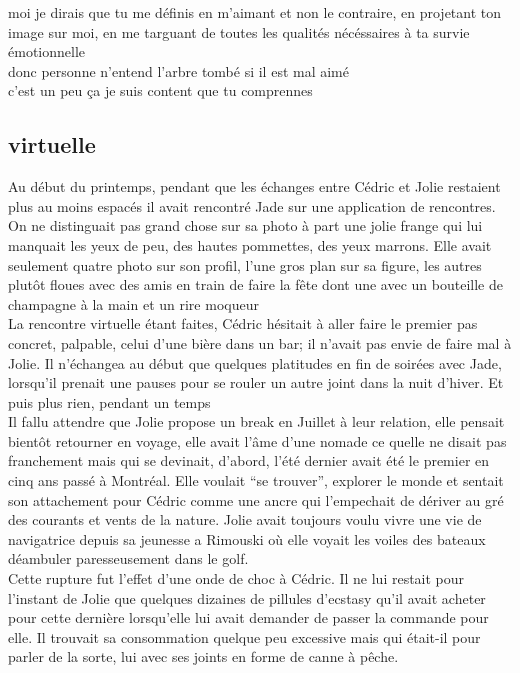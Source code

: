 \documentclass{article}
\begin{document}
moi je dirais que tu me définis en m'aimant et non le contraire, en projetant
ton image sur moi, en me targuant de toutes les qualités nécéssaires à ta survie
émotionnelle\\

donc personne n'entend l'arbre tombé si il est mal aimé\\

c'est un peu ça je suis content que tu comprennes\\

\clearpage

\subsection{virtuelle}

Au début du printemps, pendant que les échanges entre Cédric et Jolie restaient
plus au moins espacés il avait rencontré Jade sur une application de rencontres.
On ne distinguait pas grand chose sur sa photo à part une jolie frange qui lui
manquait les yeux de peu, des hautes pommettes, des yeux marrons. Elle avait
seulement quatre photo sur son profil, l'une gros plan sur sa figure, les autres
plutôt floues avec des amis en train de faire la fête dont une avec un bouteille
de champagne à la main et un rire moqueur\\

La rencontre virtuelle étant faites, Cédric hésitait à aller faire le premier
pas concret, palpable, celui d'une bière dans un bar; il n'avait pas envie de faire mal
à Jolie. Il n'échangea au début que quelques platitudes en fin de soirées avec
Jade, lorsqu'il prenait une pauses pour se rouler un autre joint dans la nuit
d'hiver. Et puis plus rien, pendant un temps\\


Il fallu attendre que Jolie propose un break en Juillet à leur relation, elle
pensait bientôt retourner en voyage, elle avait l'âme d'une nomade ce quelle ne
disait pas franchement mais qui se devinait, d'abord, l'été dernier avait été le
premier en cinq ans passé à Montréal. Elle voulait ``se trouver'', explorer le monde
et sentait son attachement pour Cédric comme une ancre qui l'empechait de dériver
au gré des courants et vents de la nature. Jolie avait toujours voulu vivre une vie
de navigatrice depuis sa jeunesse a Rimouski où elle voyait les voiles des bateaux
déambuler paresseusement dans le  golf.\\

Cette rupture fut l'effet d'une onde de choc à Cédric. Il ne lui restait pour
l'instant de Jolie que quelques dizaines de pillules d'ecstasy qu'il avait
acheter pour cette dernière lorsqu'elle lui avait demander de passer la commande pour
elle. Il trouvait sa consommation quelque peu excessive mais qui était-il pour
parler de la sorte, lui avec ses joints en forme de canne à pêche.\\
\end{document}
